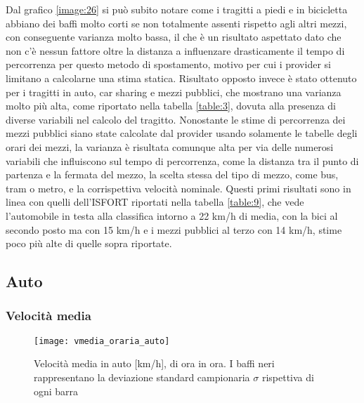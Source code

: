 Dal grafico \ref{image:26} si può subito notare come i tragitti a piedi e in bicicletta abbiano dei baffi molto corti se non totalmente assenti rispetto agli altri mezzi, con conseguente varianza molto bassa, il che è un risultato aspettato dato che non c'è nessun fattore oltre la distanza a influenzare drasticamente il tempo di percorrenza per questo metodo di spostamento, motivo per cui i provider si limitano a calcolarne una stima statica. Risultato opposto invece è stato ottenuto per i tragitti in auto, car sharing e mezzi pubblici, che mostrano una varianza molto più alta, come riportato nella tabella \ref{table:3}, dovuta alla presenza di diverse variabili nel calcolo del tragitto. Nonostante le stime di percorrenza dei mezzi pubblici siano state calcolate dal provider usando solamente le tabelle degli orari dei mezzi, la varianza è risultata comunque alta per via delle numerosi variabili che influiscono sul tempo di percorrenza, come la distanza tra il punto di partenza e la fermata del mezzo, la scelta stessa del tipo di mezzo, come bus, tram o metro, e la corrispettiva velocità nominale. Questi primi risultati sono in linea con quelli dell'ISFORT riportati nella tabella \ref{table:9}, che vede l'automobile in testa alla classifica intorno a 22 km/h di media, con la bici al secondo posto ma con 15 km/h e i mezzi pubblici al terzo con 14 km/h, stime poco più alte di quelle sopra riportate.

\subsection{Auto}

\subsubsection{Velocità media}

\begin{figure}[H]
\texttt{[image: vmedia\_oraria\_auto]}
\caption{Velocità media in auto [km/h], di ora in ora. I baffi neri rappresentano la deviazione standard campionaria $\sigma$ rispettiva di ogni barra}
\label{image:3}
\end{figure}

